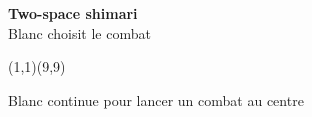 \documentclass[preview, border=0pt, varwidth=false]{standalone}
\begin{document}
	\setgounit{0.6cm} 
	
	\parbox[c][14.65cm][c]{10.2cm}{
		\centering
		
		{\Large\textbf{Two-space shimari} \\ Blanc choisit le combat}
		\vspace{3em}
		
		\begin{psgopartialboard}{(1,1)(9,9)}
			\pass
		\end{psgopartialboard}
		
		\vspace{1em}
		Blanc continue pour lancer un combat au centre
	}
	
\end{document}
